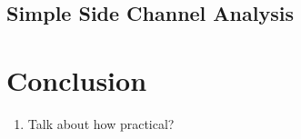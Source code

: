 \documentclass{llncs}
\begin{document}
\subsection{Simple Side Channel Analysis}




\section{Conclusion}

\begin{enumerate}
  \item Talk about how practical?
\end{enumerate}




% 
% 
% 
% 
\end{document}

